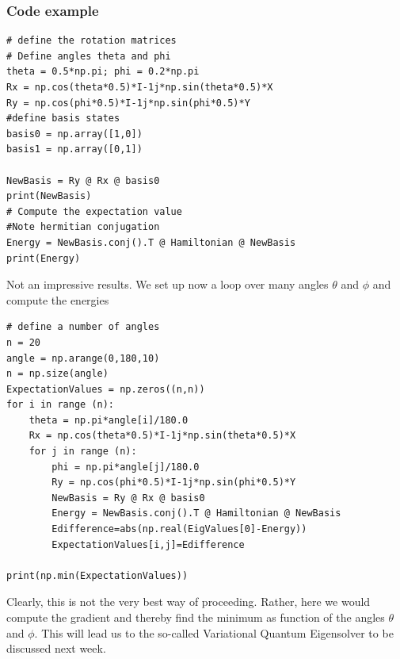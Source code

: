 \documentclass{beamer}
\begin{document}
\begin{frame}
\frametitle{Code example}

\begin{verbatim}
# define the rotation matrices
# Define angles theta and phi
theta = 0.5*np.pi; phi = 0.2*np.pi
Rx = np.cos(theta*0.5)*I-1j*np.sin(theta*0.5)*X
Ry = np.cos(phi*0.5)*I-1j*np.sin(phi*0.5)*Y
#define basis states
basis0 = np.array([1,0])
basis1 = np.array([0,1])

NewBasis = Ry @ Rx @ basis0
print(NewBasis)
# Compute the expectation value
#Note hermitian conjugation
Energy = NewBasis.conj().T @ Hamiltonian @ NewBasis
print(Energy)

\end{verbatim}

Not an impressive results. We set up now a loop over many angles $\theta$ and $\phi$ and compute the energies


















\begin{verbatim}
# define a number of angles
n = 20
angle = np.arange(0,180,10)
n = np.size(angle)
ExpectationValues = np.zeros((n,n))
for i in range (n):
    theta = np.pi*angle[i]/180.0
    Rx = np.cos(theta*0.5)*I-1j*np.sin(theta*0.5)*X
    for j in range (n):
        phi = np.pi*angle[j]/180.0
        Ry = np.cos(phi*0.5)*I-1j*np.sin(phi*0.5)*Y
        NewBasis = Ry @ Rx @ basis0
        Energy = NewBasis.conj().T @ Hamiltonian @ NewBasis
        Edifference=abs(np.real(EigValues[0]-Energy))
        ExpectationValues[i,j]=Edifference

print(np.min(ExpectationValues))

\end{verbatim}


Clearly, this is not the very best way of proceeding. Rather, here we
would compute the gradient and thereby find the minimum as function of
the angles $\theta$ and $\phi$.  This will lead us to the so-called Variational Quantum Eigensolver to be discussed next week.
\end{frame}
\end{document}
